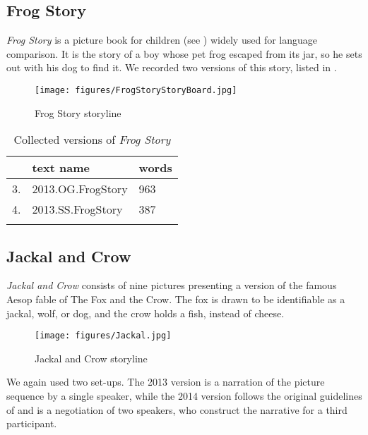 \documentclass[output=paper
,modfonts
,nonflat]{langsci/langscibook}
\begin{document}
\subsection{Frog Story \citep{Mayer1969}}\label{Methodology:Frog}
\emph{Frog Story} is a picture book for children (see ) widely used for language comparison. It is the story of a boy whose pet frog escaped from its jar, so he sets out with his dog to find it. We recorded two versions of this story, listed in .

\begin{figure}
\texttt{[image: figures/FrogStoryStoryBoard.jpg]}
\caption{Frog Story storyline \citep{Mayer1969}\label{fig:FrogStory}}
\end{figure}

\begin{table}[p]
\caption{Collected versions of \emph{Frog Story} \citep{Mayer1969}}
\label{tab:UsedTextsFrog}
 \begin{tabularx}{.7\textwidth}{Xll} 
  \lsptoprule
& text name & words \\
  \midrule
3. & 2013.OG.FrogStory & 963 \\
4. & 2013.SS.FrogStory & 387 \\
  \lspbottomrule
 \end{tabularx}
\end{table}

\subsection{Jackal and Crow \citep{Carroll2011}}\label{Methodology:Jackal}
\emph{Jackal and Crow} consists of nine pictures presenting a version of the famous Aesop fable of The Fox and the Crow. The fox is drawn to be identifiable as a jackal, wolf, or dog, and the crow holds a fish, instead of cheese.

\begin{figure}
\texttt{[image: figures/Jackal.jpg]}
\caption{Jackal and Crow storyline \citep{Carroll2011}\label{fig:Jackal}}
\end{figure}

\noindent
We again used two set-ups. The 2013 version is a narration of the picture sequence by a single speaker, while the 2014 version follows the original guidelines of \cite{Carroll2011} and is a negotiation of two speakers, who construct the narrative for a third participant.
\end{document}

